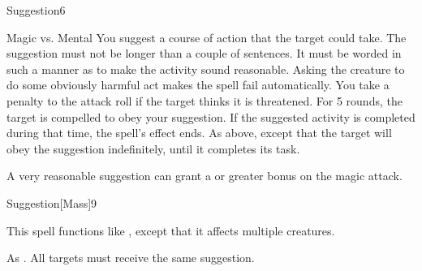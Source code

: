 \begin{spellsection}{Suggestion}{6}
    \begin{spellheader}
    \end{spellheader}
    \begin{spellcontent}
        \begin{spelltargetinginfo}
        \end{spelltargetinginfo}
        \begin{spelleffects}
            \begin{spellattack}{Magic vs. Mental}
                \spellspecial You suggest a course of action that the target could take. The suggestion must not be longer than a couple of sentences. It must be worded in such a manner as to make the activity sound reasonable. Asking the creature to do some obviously harmful act makes the spell fail automatically. You take a  penalty to the attack roll if the target thinks it is threatened.
                \spellsuccess For 5 rounds, the target is compelled to obey your suggestion. If the suggested activity is completed during that time, the spell's effect ends.
                \spellcritical As above, except that the target will obey the suggestion indefinitely, until it completes its task.
            \end{spellattack}
        \end{spelleffects}
    \end{spellcontent}
    \begin{spellfooter}
        \spellnotes A very reasonable suggestion can grant a  or greater bonus on the magic attack.

        \norepeatspellnotes
        \miscastrandom
    \end{spellfooter}
\end{spellsection}

\begin{spellsection}{Suggestion}[Mass]{9}
    \begin{spellheader}
    \end{spellheader}
    \begin{spellcontent}
        \begin{spelltargetinginfo}
        \end{spelltargetinginfo}
        \begin{spelleffects}
            \spellspecial This spell functions like , except that it affects multiple creatures.
        \end{spelleffects}
    \end{spellcontent}
    \begin{spellfooter}
        \spellnotes As . All targets must receive the same suggestion.
        \miscastexplode
    \end{spellfooter}
\end{spellsection}

